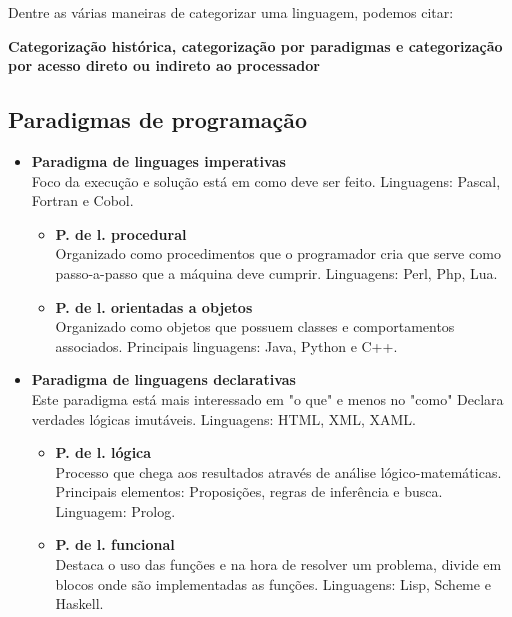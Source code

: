 \documentclass[12pt]{article}
\begin{document}
Dentre as várias maneiras de categorizar uma linguagem, podemos citar:

\textbf{Categorização histórica, categorização por paradigmas e categorização por
acesso direto ou indireto ao processador}

\subsection{Paradigmas de programação}
\begin{itemize}
    \item \textbf{Paradigma de linguages imperativas\\}
    Foco da execução e solução está em como deve ser feito.
    Linguagens: Pascal, Fortran e Cobol.
    \begin{itemize}
        \item \textbf{P. de l. procedural\\}
        Organizado como procedimentos que o programador cria que serve como 
        passo-a-passo que a máquina deve cumprir.
        Linguagens: Perl, Php, Lua.
        \item \textbf{P. de l. orientadas a objetos\\}
        Organizado como objetos que possuem classes e comportamentos associados.
        Principais linguagens: Java, Python e C++.
    \end{itemize}

\newpage

    \item \textbf{Paradigma de linguagens declarativas\\}
    Este paradigma está mais interessado em "o que" e menos no "como"
    Declara verdades lógicas imutáveis.
    Linguagens: HTML, XML, XAML.
    \begin{itemize}
        \item \textbf{P. de l. lógica\\}
        Processo que chega aos resultados através de análise lógico-matemáticas.
        Principais elementos: Proposições, regras de inferência e busca.
        Linguagem: Prolog.
        \item \textbf{P. de l. funcional\\}
        Destaca o uso das funções e na hora de resolver um problema, divide em blocos
        onde são implementadas as funções.
        Linguagens: Lisp, Scheme e Haskell.
    \end{itemize}
\end{itemize}
\end{document}
